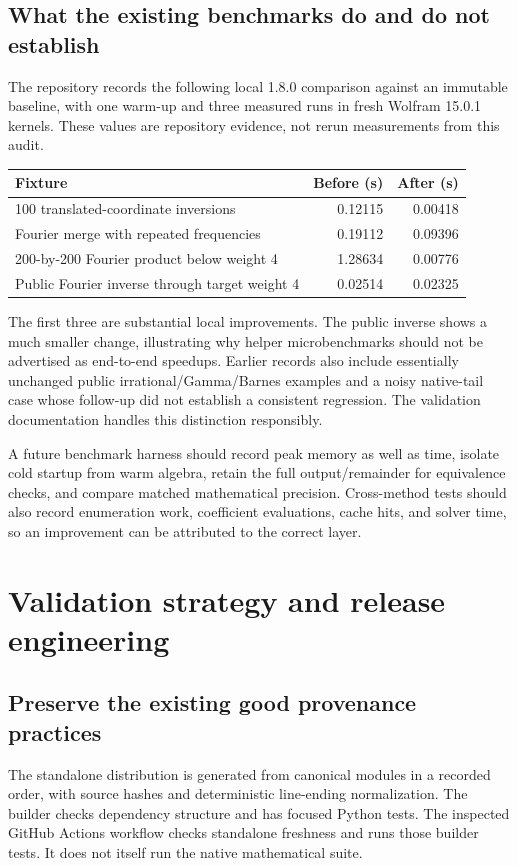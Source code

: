 \documentclass[11pt,a4paper]{article}
\begin{document}
\subsection{What the existing benchmarks do and do not establish}
The repository records the following local 1.8.0 comparison against an immutable baseline, with one warm-up and three measured runs in fresh Wolfram 15.0.1 kernels. These values are repository evidence, not rerun measurements from this audit.\cite{validation}
\begin{longtable}{@{}p{}rr@{}}
\toprule
Fixture & Before (s) & After (s)\\\midrule\endhead
100 translated-coordinate inversions & 0.12115 & 0.00418\\
Fourier merge with repeated frequencies & 0.19112 & 0.09396\\
200-by-200 Fourier product below weight 4 & 1.28634 & 0.00776\\
Public Fourier inverse through target weight 4 & 0.02514 & 0.02325\\
\bottomrule
\end{longtable}
The first three are substantial local improvements. The public inverse shows a much smaller change, illustrating why helper microbenchmarks should not be advertised as end-to-end speedups. Earlier records also include essentially unchanged public irrational/Gamma/Barnes examples and a noisy native-tail case whose follow-up did not establish a consistent regression. The validation documentation handles this distinction responsibly.\cite{validation}

A future benchmark harness should record peak memory as well as time, isolate cold startup from warm algebra, retain the full output/remainder for equivalence checks, and compare matched mathematical precision. Cross-method tests should also record enumeration work, coefficient evaluations, cache hits, and solver time, so an improvement can be attributed to the correct layer.

\section{Validation strategy and release engineering}

\subsection{Preserve the existing good provenance practices}
The standalone distribution is generated from canonical modules in a recorded order, with source hashes and deterministic line-ending normalization. The builder checks dependency structure and has focused Python tests. The inspected GitHub Actions workflow checks standalone freshness and runs those builder tests. It does not itself run the native mathematical suite.\cite{development,workflow}
\end{document}
